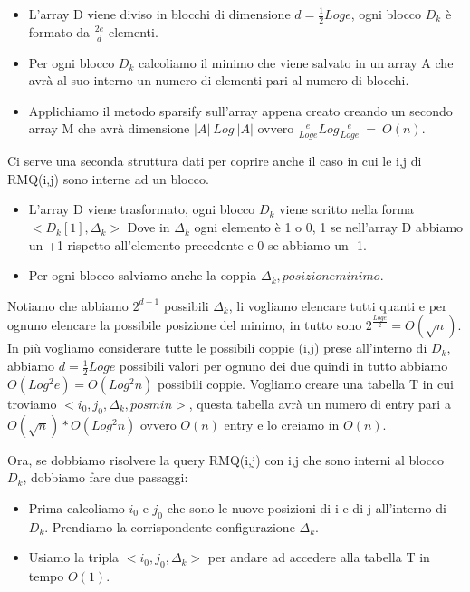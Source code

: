 \documentclass[12pt]{article}
\begin{document}
\begin{itemize}
\item L'array D viene diviso in blocchi di dimensione $d=\frac{1}{2}Log e$, ogni blocco $D_k$ è formato da $\frac{2e}{d}$ elementi.
\item Per ogni blocco $D_k$ calcoliamo il minimo che viene salvato in un array A che avrà al suo interno un numero di elementi pari al numero di blocchi. 
\item Applichiamo il metodo sparsify sull'array appena creato creando un secondo array M che avrà dimensione $|A|\ Log\ |A|$ ovvero $\frac{e}{Loge}Log \frac{e}{Loge}\ =\ O(n)$.
\end{itemize}

Ci serve una seconda struttura dati per coprire anche il caso in cui le i,j di RMQ(i,j) sono interne ad un blocco.
\begin{itemize}
\item L'array D viene trasformato, ogni blocco $D_k$ viene scritto nella forma $<D_k[1], \Delta_k>$ Dove in $\Delta_k$ ogni elemento è 1 o 0, 1 se nell'array D abbiamo un +1 rispetto all'elemento precedente e 0 se abbiamo un -1.
\item Per ogni blocco salviamo anche la coppia $\Delta_k, posizione minimo$.
\end{itemize}

Notiamo che abbiamo $2^{d-1}$ possibili $\Delta_k$, li vogliamo elencare tutti quanti e per ognuno elencare la possibile posizione del minimo, in tutto sono $2^{\frac{Loge}{2}} = O(\sqrt{n})$.
In più vogliamo considerare tutte le possibili coppie (i,j) prese all'interno di $D_k$, abbiamo $d=\frac{1}{2}Log e$ possibili valori per ognuno dei due quindi in tutto abbiamo $O(Log^2 e) = O(Log^2 n)$ possibili coppie.
Vogliamo creare una tabella T in cui troviamo $<i_0,j_0, \Delta_k, pos min>$, questa tabella avrà un numero di entry pari a $O(\sqrt{n})*O(Log^2 n)$ ovvero $O(n)$ entry e lo creiamo in $O(n)$.

Ora, se dobbiamo risolvere la query RMQ(i,j) con i,j che sono interni al blocco $D_k$, dobbiamo fare due passaggi:
\begin{itemize}
\item Prima calcoliamo $i_0$ e $j_0$ che sono le nuove posizioni di i e di j all'interno di $D_k$. Prendiamo la corrispondente configurazione $\Delta_k$.
\item Usiamo la tripla $<i_0,j_0,\Delta_k>$ per andare ad accedere alla tabella T in tempo $O(1)$.
\end{itemize}
\end{document}

